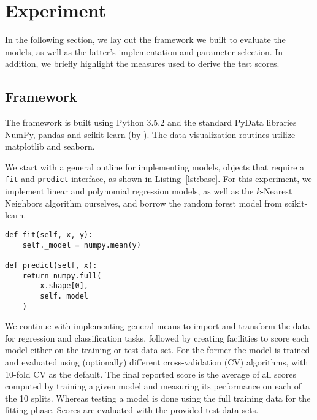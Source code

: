 \section{Experiment}
\label{sec:three}

In the following section, we lay out the framework we built to evaluate the
models, as well as the latter's implementation and parameter selection.  In
addition, we briefly highlight the measures used to derive the test scores.

\subsection{Framework}

The framework is built using Python 3.5.2 and the standard PyData libraries
NumPy, pandas and
scikit-learn (by \citet{sklearn:2011}).  The data
visualization routines utilize matplotlib and
seaborn.

We start with a general outline for implementing models, objects that require a
\texttt{fit} and \texttt{predict} interface, as shown in Listing~\ref{lst:base}.
For this experiment, we implement linear and polynomial regression models, as
well as the $k$-Nearest Neighbors algorithm ourselves, and borrow the random
forest model from scikit-learn.

\begin{lstlisting}
def fit(self, x, y):
    self._model = numpy.mean(y)

def predict(self, x):
    return numpy.full(
        x.shape[0],
        self._model
    )
\end{lstlisting}

We continue with implementing general means to import and transform the data for
regression and classification tasks, followed by creating facilities to score
each model either on the training or test data set.  For the former the model is
trained and evaluated using (optionally) different cross-validation (CV)
algorithms, with 10-fold CV as the default.  The final reported score is the
average of all scores computed by training a given model and measuring its
performance on each of the 10 splits.  Whereas testing a model is done using the
full training data for the fitting phase.  Scores are evaluated with the
provided test data sets.

